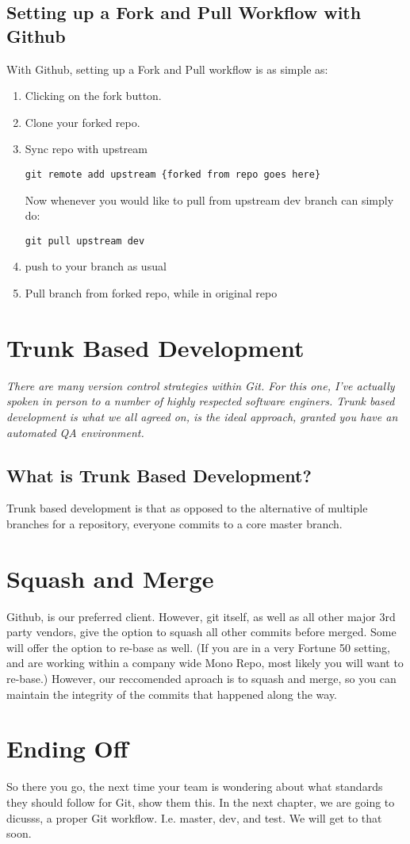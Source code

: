 \subsection { Setting up a Fork and Pull Workflow with Github }
With Github, setting up a Fork and Pull workflow is as simple as: 
\begin{enumerate}
  \item Clicking on the fork button.
  \item Clone your forked repo.
  \item Sync repo with upstream 
\begin{verbatim}
git remote add upstream {forked from repo goes here}
\end{verbatim}
Now whenever you would like to pull from upstream dev branch can simply do: 
\begin{verbatim}
git pull upstream dev   
\end{verbatim}
  \item push to your branch as usual
  \item Pull branch from forked repo, while in original repo 
\end{enumerate}

\section{Trunk Based Development}
\textit{There are many version control strategies within Git. For this one, I've actually spoken in person to a number of highly respected software enginers. Trunk based development is what we all agreed on, is the ideal approach, granted you have an automated QA environment.}

\subsection{What is Trunk Based Development?}
Trunk based development is that as opposed to the alternative of multiple branches for a repository, everyone commits to a core master branch. 

\section { Squash and Merge }
Github, is our preferred client. However, git itself, as well as all other major 3rd party vendors, give the option to squash all other commits before merged. Some will offer the option to re-base as well. (If you are in a very Fortune 50 setting, and are working within a company wide Mono Repo, most likely you will want to re-base.) However, our reccomended aproach is to squash and merge, so you can maintain the integrity of the commits that happened along the way. 

\section{Ending Off}
So there you go, the next time your team is wondering about what standards they should follow for Git, show them this. In the next chapter, we are going to dicusss, a proper Git workflow. I.e. master, dev, and test. We will get to that soon. 